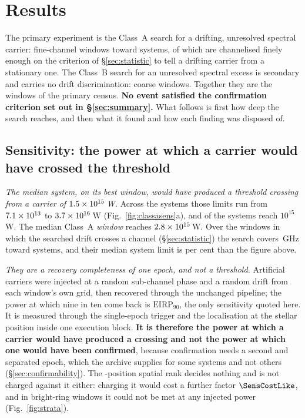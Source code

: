 \section{Results}
\label{sec:results}

The primary experiment is the Class~A search for a drifting, unresolved
spectral carrier: \NWinA{} fine-channel windows toward \NSysClassA{}
systems, \EdrNWinA{} of which are channelised finely enough on the criterion
of \S\ref{sec:statistic} to tell a drifting carrier from a stationary one.
The Class~B search for an unresolved spectral excess is secondary
and carries no drift discrimination: \NWinB{} coarse windows. Together they
are the \NWindows{} windows of the primary census. \textbf{No event
satisfied the confirmation criterion set out in \S\ref{sec:summary}.} What
follows is first how deep the search reaches, and then what it found and how
each finding was disposed of.

\subsection{Sensitivity: the power at which a carrier would have crossed
the threshold} \label{sec:pninetysel}

\emph{The median system, on its best window, would have produced a threshold
crossing from a carrier of $1.5\times10^{15}$\,W.} Across the \NSysClassA{} systems those limits
run from $7.1\times10^{13}$ to $3.7\times10^{16}$\,W
(Fig.~\ref{fig:classasens}a), and \NSysEfifteen{} of the systems reach
$10^{15}$\,W. The median Class~A \emph{window} reaches
$2.8\times10^{15}$\,W.
Over the \EdrNWinA{} windows in which the searched drift crosses a channel
(\S\ref{sec:statistic}) the search covers \EdrUnionGHz\,GHz toward
\EdrNSys{} systems, and their median system limit is \ScEdrMedPct{} per cent
\ScEdrMedSense{} than the figure above.

\emph{They are a recovery completeness of one epoch, and not a threshold.}
Artificial carriers were injected at a random sub-channel phase and a random
drift from each window's own grid, then recovered through the unchanged
pipeline; the power at which nine in ten come back is
$\mathrm{EIRP}_{90}$, the only sensitivity quoted here. It is measured
through the single-epoch trigger and the localisation at the stellar position
inside one execution block. \textbf{It is therefore the power at which a
carrier would have produced a crossing and not the power at which one would
have been confirmed}, because confirmation needs a second and separated epoch, which the archive
supplies for some systems and not others (\S\ref{sec:confirmability}). The \NCtrl-position spatial rank
decides nothing and is not charged against it either: charging it would cost
a further factor $\SensCostLike$, and in \SensNRingHiUnres{} bright-ring
windows it could not be met at any injected power (Fig.~\ref{fig:strata}).

